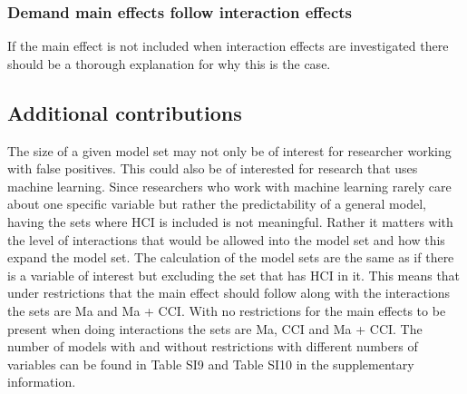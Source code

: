 \subsubsection{Demand main effects follow interaction effects}
If the main effect is not included when interaction effects are investigated there should be a thorough explanation for why this is the case.

\subsection{Additional contributions}
The size of a given model set may not only be of interest for researcher working with false positives. This could also be of interested for research that uses machine learning. Since researchers who work with machine learning rarely care about one specific variable but rather the predictability of a general model, having the sets where HCI is included is not meaningful. Rather it matters with the level of interactions that would be allowed into the model set and how this expand the model set. The calculation of the model sets are the same as if there is a variable of interest but excluding the set that has HCI in it. This means that under restrictions that the main effect should follow along with the interactions the sets are Ma and Ma + CCI. With no restrictions for the main effects to be present when doing interactions the sets are Ma, CCI and Ma + CCI. The number of models with and without restrictions with different numbers of variables can be found in Table SI9 and Table SI10 in the supplementary information. 


 
